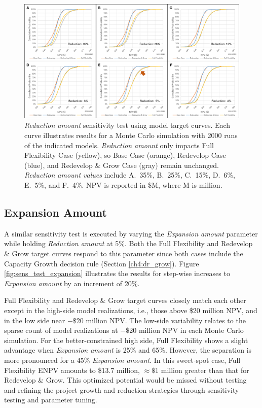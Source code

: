 \begin{figure}[!htp]
\centering
\includegraphics[width=.98\textwidth]{templates/images/Figure-Sensitivity_Reduction.pdf.png}
\caption[Reduction Amount sensitivity test]{\textit{Reduction amount} sensitivity test using model target curves. Each curve illustrates results for a Monte Carlo simulation with 2000 runs of the indicated models. \textit{Reduction amount} only impacts Full Flexibility Case (yellow), so Base Case (orange), Redevelop Case (blue), and Redevelop \& Grow Case (gray) remain unchanged. \textit{Reduction amount values} include A.\ 35\%, B.\ 25\%, C.\ 15\%, D.\ 6\%, E.\ 5\%, and F.\ 4\%. NPV is reported in \$M, where M is million.}
\label{fig:sens_test_reduction}
\end{figure}

\subsection{Expansion Amount}
\label{ch6:sens_expamt}

A similar sensitivity test is executed by varying the \textit{Expansion amount} parameter while holding \textit{Reduction amount} at 5\%. Both the Full Flexibility and Redevelop \& Grow target curves respond to this parameter since both cases include the Capacity Growth decision rule (Section \ref{ch4:dr_grow}). Figure \ref{fig:sens_test_expansion} illustrates the results for step-wise increases to \textit{Expansion amount} by an increment of 20\%. 

Full Flexibility and Redevelop \& Grow target curves closely match each other except in the high-side model realizations, i.e., those above \$20 million NPV, and in the low side near $-\$$20 million NPV. The low-side variability relates to the sparse count of model realizations at $-\$$20 million NPV in each Monte Carlo simulation. For the better-constrained high side, Full Flexibility shows a slight advantage when \textit{Expansion amount} is 25\% and 65\%. However, the separation is more pronounced for a 45\% \textit{Expansion amount}. In this sweet-spot case, Full Flexibility ENPV amounts to \$13.7 million, $\approx\$1$ million greater than that for Redevelop \& Grow. This optimized potential would be missed without testing and refining the project growth and reduction strategies through sensitivity testing and parameter tuning.

